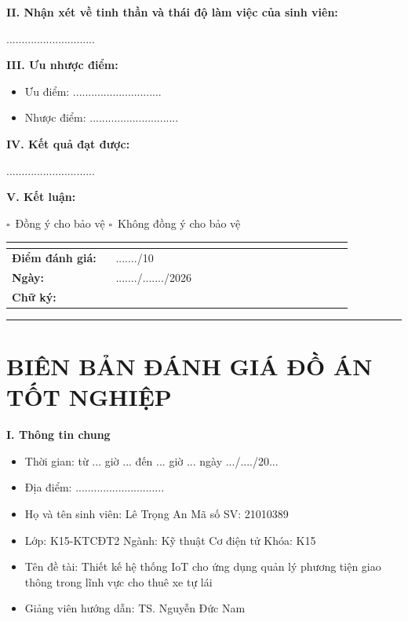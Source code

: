 \documentclass[13pt,a4paper]{extarticle}
\newcounter{none} %
\newcommand{\thesislongtableorignewline}{}
\let\thesislongtableorignewline\\
\renewcommand{\\}{\thesislongtableorignewline\hline}%
\let\\\thesislongtableorignewline
\newcommand{\majorheading}[1]{\clearpage\section*{#1}}
\newcommand{\checkbox}{\(\square\)}
\newcommand{\thesisspacer}{\hspace{2em}}
\providecommand{\tightlist}{%
  \setlength{\itemsep}{0pt}\setlength{\parskip}{0pt}}
\begin{document}
\textbf{II. Nhận xét về tinh thần và thái độ làm việc của sinh viên:}

.............................

\textbf{III. Ưu nhược điểm:}

\begin{itemize}
\tightlist
\item
  Ưu điểm: .............................
\item
  Nhược điểm: .............................
\end{itemize}

\textbf{IV. Kết quả đạt được:}

.............................

\textbf{V. Kết luận:}

\checkbox\ Đồng ý cho bảo vệ \thesisspacer \checkbox\ Không đồng ý cho bảo vệ

{\def\LTcaptype{none} %
\begin{longtable}{|p{0.28\linewidth}|p{0.64\linewidth}|}
\hline \textbf{} & \textbf{} \\
\hline
\endhead
\hline
\endlastfoot
\textbf{Điểm đánh giá:} & ......./10 \\
\textbf{Ngày:} & ......./......./2026 \\
\textbf{Chữ ký:} & \\
\end{longtable}
}

\begin{center}\rule{0.5\linewidth}{0.5pt}\end{center}

\majorheading{BIÊN BẢN ĐÁNH GIÁ ĐỒ ÁN TỐT NGHIỆP}

\textbf{I. Thông tin chung}

\begin{itemize}
\tightlist
\item
  Thời gian: từ ... giờ ... đến ... giờ ... ngày .../..../20...
\item
  Địa điểm: .............................
\item
  Họ và tên sinh viên: Lê Trọng An \thesisspacer Mã số SV: 21010389
\item
  Lớp: K15-KTCĐT2 \thesisspacer Ngành: Kỹ thuật Cơ điện tử \thesisspacer Khóa: K15
\item
  Tên đề tài: Thiết kế hệ thống IoT cho ứng dụng quản lý phương tiện
  giao thông trong lĩnh vực cho thuê xe tự lái
\item
  Giảng viên hướng dẫn: TS. Nguyễn Đức Nam
\end{itemize}
\end{document}

